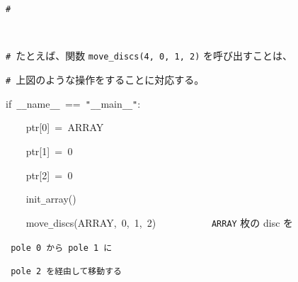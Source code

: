 \documentclass{article}
\begin{document}
\noindent
\mbox{}{\tt\#}
\tt\mc 

\noindent
\mbox{}\rm\mc {\tt\#}\  {}\noindent  \rm\mc 

\noindent
\mbox{}{\tt\#}\  {}たとえば、関数 {\tt move\_discs(4, 0, 1, 2)} を呼び出すことは、  \rm\mc 

\noindent
\mbox{}{\tt\#}\  {}上図のような操作をすることに対応する。\hfill  \rm\mc 

\noindent
\mbox{}\tt\mc \hfill

\noindent
\mbox{}\hfill

\noindent
\mbox{}if{\tt\mc \ }{\tt\_}{\tt\_}name{\tt\_}{\tt\_}{\tt\mc \ }=={\tt\mc \ }{\tt "}{\tt\_}{\tt\_}main{\tt\_}{\tt\_}{\tt "}:

\noindent
\mbox{}{\tt\mc \ \ \ \ }ptr[0]{\tt\mc \ }={\tt\mc \ }ARRAY

\noindent
\mbox{}{\tt\mc \ \ \ \ }ptr[1]{\tt\mc \ }={\tt\mc \ }0

\noindent
\mbox{}{\tt\mc \ \ \ \ }ptr[2]{\tt\mc \ }={\tt\mc \ }0

\noindent
\mbox{}\hfill

\noindent
\mbox{}{\tt\mc \ \ \ \ }init{\tt\_}array()

\noindent
\mbox{}{\tt\mc \ \ \ \ }move{\tt\_}discs(ARRAY,{\tt\mc \ }0,{\tt\mc \ }1,{\tt\mc \ }2){\tt\mc \ \ \ \ \ \ \ \ \ \ }\rm\mc {\tt\#}\  {}{\tt ARRAY} 枚の disc を \hfill  \rm\mc 

\noindent
\mbox{}\tt\mc {\tt\mc \ \ \ \ \ \ \ \ \ \ \ \ \ \ \ \ \ \ \ \ \ \ \ \ \ \ \ \ \ \ \ \ \ \ \ \ \ \ \ \ }\rm\mc {\tt\#}\  {}pole 0 から pole 1 に \hfill  \rm\mc 

\noindent
\mbox{}\tt\mc {\tt\mc \ \ \ \ \ \ \ \ \ \ \ \ \ \ \ \ \ \ \ \ \ \ \ \ \ \ \ \ \ \ \ \ \ \ \ \ \ \ \ \ }\rm\mc {\tt\#}\  {}pole 2 を経由して移動する \hfill  \rm\mc 

\noindent
\mbox{}

\rm\mc
\end{document}
